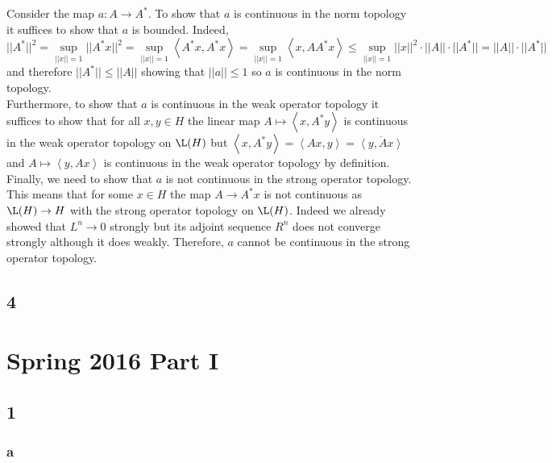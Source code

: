 \documentclass[12pt]{article}
\newcommand{\inner}[2]{\left< #1, #2 \right>}
\begin{document}
Consider the map $a : A \to A^*$. To show that $a$ is continuous in the norm topology it suffices to show that $a$ is bounded. Indeed,
\[ || A^* ||^2 = \sup_{|| x || = 1} || A^* x ||^2 = \sup_{|| x || = 1} \inner{A^* x}{A^* x} = \sup_{|| x || = 1} \inner{x}{A A^* x} \le \sup_{|| x || = 1} || x ||^2 \cdot || A || \cdot || A^* || = || A || \cdot || A^* || \]
and therefore $|| A^* || \le || A ||$ showing that $|| a || \le 1$ so $a$ is continuous in the norm topology.
\bigskip\\
Furthermore, to show that $a$ is continuous in the weak operator topology it suffices to show that for all $x, y \in H$ the linear map $A \mapsto \inner{x}{A^* y}$ is continuous in the weak operator topology on $\L(H)$ but $\inner{x}{A^* y} = \inner{A x}{y} = \overline{\inner{y}{A x}}$ and $A \mapsto \inner{y}{A x}$ is continuous in the weak operator topology by definition. 
\bigskip\\
Finally, we need to show that $a$ is not continuous in the strong operator topology. This means that for some $x \in H$ the map $A \to A^* x$ is not continuous as $\L(H) \to H$ with the strong operator topology on $\L(H)$. Indeed we already showed that $L^n \to 0$ strongly but its adjoint sequence $R^n$ does not converge strongly although it does weakly. Therefore, $a$ cannot be continuous in the strong operator topology.

\subsection{4}


\section{Spring 2016 Part I}

\subsection{1}

\subsubsection{a}
\end{document}

